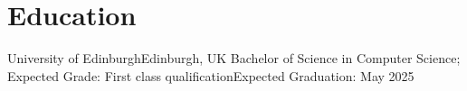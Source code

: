 \section{Education}
  \resumeSubHeadingListStart
    \resumeSubheading
      {University of Edinburgh}{Edinburgh, UK}
      {Bachelor of Science in Computer Science; Expected Grade: First class qualification}{Expected Graduation: May 2025}
  \resumeSubHeadingListEnd